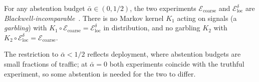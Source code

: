 \documentclass[runningheads,envcountsame]{llncs}
\newcommand{\cE}{\mathcal{E}}
\begin{document}
\begin{theorem}
\label{thm:dichotomy}
For any abstention budget $\bar\alpha \in (0, 1/2)$, the two experiments $\cE_{\mathrm{coarse}}$ and $\cE_{\mathrm{loc}}^\delta$ are \emph{Blackwell-incomparable}~\cite{blackwell1953equivalent,lecam1986asymptotic,torgersen1991comparison}. There is no Markov kernel $K_1$ acting on signals (a \emph{garbling}) with $K_1 \circ \cE_{\mathrm{coarse}} = \cE_{\mathrm{loc}}^\delta$ in distribution, and no garbling $K_2$ with $K_2 \circ \cE_{\mathrm{loc}}^\delta = \cE_{\mathrm{coarse}}$.
\end{theorem}

The restriction to $\bar\alpha < 1/2$ reflects deployment, where abstention budgets are small fractions of traffic; at $\bar\alpha = 0$ both experiments coincide with the truthful experiment, so some abstention is needed for the two to differ.
\end{document}
